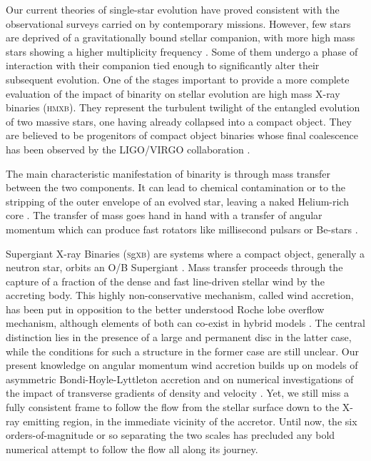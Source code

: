 \documentclass[a4paper,fleqn,usenatbib]{article}
\makeatletter
\newcommand{\sgx}{\textsc{s}g\textsc{xb}\xspace}
\newcommand*{\hmxb}{\textsc{hmxb}\@\xspace}
\newcommand*{\eg}{e.g.\@\xspace}
\makeatother
\begin{document}
Our current theories of single-star evolution have proved consistent with the observational surveys carried on by contemporary missions. However, few stars are deprived of a gravitationally bound stellar companion, with more high mass stars showing a higher multiplicity frequency \citep{Duchene2013}. Some of them undergo a phase of interaction with their companion tied enough to significantly alter their subsequent evolution. One of the stages important to provide a more complete evaluation of the impact of binarity on stellar evolution are high mass X-ray binaries (\hmxb). They represent the turbulent twilight of the entangled evolution of two massive stars, one having already collapsed into a compact object. They are believed to be progenitors of compact object binaries whose final coalescence has been observed by the LIGO/VIRGO collaboration \citep{Abbott2016a}.

The main characteristic manifestation of binarity is through mass transfer between the two components. It can lead to chemical contamination \citep[\eg in the case of Barium and Carbon-enhanced metal-poor stars][]{Boffin2014,Masseron2009} or to the stripping of the outer envelope of an evolved star, leaving a naked Helium-rich core \citep[\eg for some hot subdwarf stars][]{XXX Podsiadlowski2010, Mereghetti2014 or Han? XXX}. The transfer of mass goes hand in hand with a transfer of angular momentum which can produce fast rotators like millisecond pulsars \citep{XXX Podsiadlowski2010? XXX} or Be-stars \citep{XXX Podsiadlowski2010? XXX}.

Supergiant X-ray Binaries (\sgx) are systems where a compact object, generally a neutron star, orbits an O/B Supergiant \citep[see][for a recent review]{Martinez-Nunez2017}. Mass transfer proceeds through the capture of a fraction of the dense and fast line-driven stellar wind by the accreting body. This highly non-conservative mechanism, called wind accretion, has been put in opposition to the better understood Roche lobe overflow mechanism, although elements of both can co-exist in hybrid models \citep{Mohamed,ElMellah2016a}. The central distinction lies in the presence of a large and permanent disc in the latter case, while the conditions for such a structure in the former case are still unclear. Our present knowledge on angular momentum wind accretion builds up on models of asymmetric Bondi-Hoyle-Lyttleton accretion \citep{Illarionov1975,Shapiro1976} and on numerical investigations of the impact of transverse gradients of density \citep{Ruffert1999,MacLeod2015} and velocity \citep{Ruffert1996}. Yet, we still miss a fully consistent frame to follow the flow from the stellar surface down to the X-ray emitting region, in the immediate vicinity of the accretor. Until now, the six orders-of-magnitude or so separating the two scales has precluded any bold numerical attempt to follow the flow all along its journey.
\end{document}
